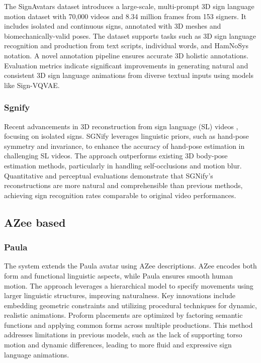 \documentclass[../../main.tex]{subfiles}
\begin{document}
The SignAvatars \cite{yu2023signavatars} dataset introduces a large-scale, multi-prompt 3D sign language motion dataset with 70,000 videos and 8.34 million frames from 153 signers. It includes isolated and continuous signs, annotated with 3D meshes and biomechanically-valid poses. The dataset supports tasks such as 3D sign language recognition and production from text scripts, individual words, and HamNoSys notation. A novel annotation pipeline ensures accurate 3D holistic annotations. Evaluation metrics indicate significant improvements in generating natural and consistent 3D sign language animations from diverse textual inputs using models like Sign-VQVAE.

\subsubsection{Sgnify}
\label{subsubsec:sgnify}

Recent advancements in 3D reconstruction from sign language (SL) videos \cite{sgnify}, focusing on isolated signs. SGNify leverages linguistic priors, such as hand-pose symmetry and invariance, to enhance the accuracy of hand-pose estimation in challenging SL videos. The approach outperforms existing 3D body-pose estimation methods, particularly in handling self-occlusions and motion blur. Quantitative and perceptual evaluations demonstrate that SGNify's reconstructions are more natural and comprehensible than previous methods, achieving sign recognition rates comparable to original video performances.

\subsection{AZee based}
\label{subsec:azee_based}

\subsubsection{Paula}
\label{subsubsec:paula}

The system extends the Paula avatar using AZee descriptions. AZee encodes both form and functional linguistic aspects, while Paula ensures smooth human motion. The approach leverages a hierarchical model to specify movements using larger linguistic structures, improving naturalness. Key innovations include embedding geometric constraints and utilizing procedural techniques for dynamic, realistic animations. Proform placements are optimized by factoring semantic functions and applying common forms across multiple productions. This method addresses limitations in previous models, such as the lack of supporting torso motion and dynamic differences, leading to more fluid and expressive sign language animations.
\end{document}
